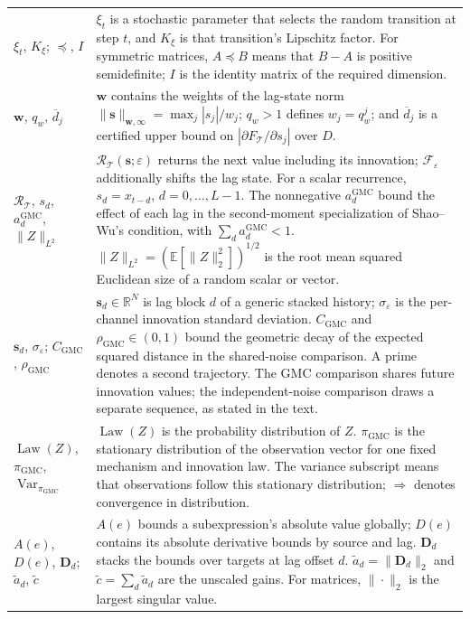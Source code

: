 \begin{longtable}{@{}
>{\raggedright\arraybackslash}p{}
>{\raggedright\arraybackslash}p{}@{}}
$\xi_t$, $K_{\xi}$; $\preceq$, $I$ &
$\xi_t$ is a stochastic parameter that selects the random transition at step
$t$, and $K_{\xi}$ is that transition's Lipschitz factor. For symmetric
matrices, $A\preceq B$ means that $B-A$ is positive semidefinite; $I$ is the
identity matrix of the required dimension. \\

$\mathbf w$, $q_w$, $\overline d_j$ &
$\mathbf w$ contains the weights of the lag-state norm
$\|\mathbf{s}\|_{\mathbf w,\infty}=\max_j|s_j|/w_j$;
$q_w>1$ defines $w_j=q_w^j$; and $\overline d_j$ is a certified upper bound on
$|\partial F_{\mathcal T}/\partial s_j|$ over $D$. \\

$\mathcal R_{\mathcal T}$, $s_d$, $a_d^{\mathrm{GMC}}$,
$\|Z\|_{L^2}$ &
$\mathcal R_{\mathcal T}(\mathbf{s};\varepsilon)$ returns the next value
including its innovation; $\mathcal F_{\varepsilon}$ additionally shifts the
lag state. For a scalar recurrence, $s_d=x_{t-d}$,
$d=0,\ldots,L-1$. The nonnegative $a_d^{\mathrm{GMC}}$ bound the effect of
each lag in the second-moment specialization of Shao--Wu's condition, with
$\sum_d a_d^{\mathrm{GMC}}<1$.
$\|Z\|_{L^2}=(\mathbb E[\|Z\|_2^2])^{1/2}$ is the root mean squared
Euclidean size of a random scalar or vector. \\

$\mathbf{s}_d$, $\sigma_\varepsilon$;
$C_{\mathrm{GMC}}$, $\rho_{\mathrm{GMC}}$ &
$\mathbf{s}_d\in\mathbb R^N$ is lag block $d$ of a generic stacked history;
$\sigma_\varepsilon$ is the per-channel innovation standard deviation.
$C_{\mathrm{GMC}}$ and $\rho_{\mathrm{GMC}}\in(0,1)$ bound the geometric
decay of the expected squared distance in the shared-noise comparison. A prime
denotes a second trajectory. The GMC comparison shares future innovation
values; the independent-noise comparison draws a separate sequence, as stated
in the text. \\

$\operatorname{Law}(Z)$, $\pi_{\mathrm{GMC}}$,
$\operatorname{Var}_{\pi_{\mathrm{GMC}}}$ &
$\operatorname{Law}(Z)$ is the probability distribution of $Z$.
$\pi_{\mathrm{GMC}}$ is the stationary distribution of the observation vector
for one fixed mechanism and innovation law. The variance subscript means that
observations follow this stationary distribution; $\Rightarrow$ denotes
convergence in distribution. \\

$A(e)$, $D(e)$, $\mathbf D_d$;
$\widetilde a_d$, $\widetilde c$ &
$A(e)$ bounds a subexpression's absolute value globally; $D(e)$ contains its
absolute derivative bounds by source and lag. $\mathbf D_d$ stacks the bounds
over targets at lag offset $d$. $\widetilde a_d=\|\mathbf D_d\|_2$ and
$\widetilde c=\sum_d\widetilde a_d$ are the unscaled gains. For matrices,
$\|\cdot\|_2$ is the largest singular value. \\


\end{longtable}
